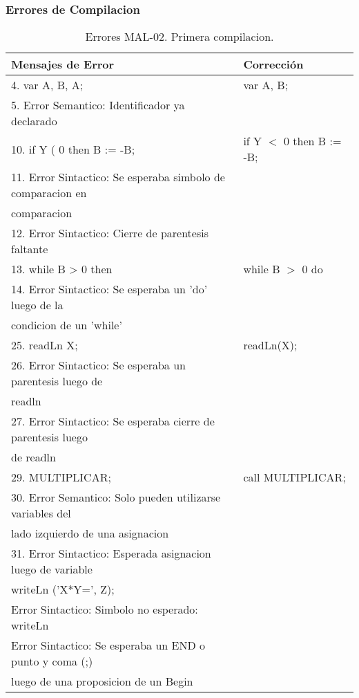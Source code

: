 \documentclass[a4paper,12pt]{article}
\begin{document}
\subsubsection{Errores de Compilacion}

\begin{table}[h!]
\centering
\begin{tabular}{|l|l|}
\hline
Mensajes de Error & Corrección\\
\hline
4. var A, B, A;												& var A, B;\\
5. Error Semantico: Identificador ya declarado				&\\
10. if Y ( 0 then B := -B;									& if Y $<$ 0 then B := -B;\\
11. Error Sintactico: Se esperaba simbolo de comparacion en 	&\\
comparacion													&\\
12. Error Sintactico: Cierre de parentesis faltante			&\\
\hline
13. while B > 0 then											& while B $>$ 0 do\\
14. Error Sintactico: Se esperaba un 'do' luego de la		&\\
condicion de un 'while'										&\\
\hline
25. readLn X;												& readLn(X);\\
26. Error Sintactico: Se esperaba un parentesis luego de		& \\
readln 														& \\
27. Error Sintactico: Se esperaba cierre de parentesis luego	& \\
de readln 													& \\
\hline
29. MULTIPLICAR;												& call MULTIPLICAR;\\
30. Error Semantico: Solo pueden utilizarse variables del 	&\\
lado izquierdo de una asignacion								&\\
31. Error Sintactico: Esperada asignacion luego de variable	&\\
writeLn ('X*Y=', Z);											&\\
Error Sintactico: Simbolo no esperado: writeLn				&\\
Error Sintactico: Se esperaba un END o punto y coma (;)		&\\
luego de una proposicion de un Begin							&\\
\hline	
\end{tabular}
\caption{Errores MAL-02. Primera compilacion.}
\label{MAL-02-1}
\end{table}
\end{document}
